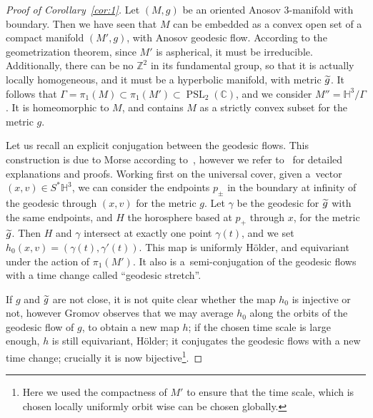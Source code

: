 \documentclass[AHL,Unicode,longabstracts,published]{cedram}
\newcommand{\Z}{\mathbb{Z}}
\newcommand{\C}{\mathbb{C}}
\newcommand{\Hh}{\mathbb{H}}
\DeclareMathOperator{\PSL}{PSL}
\theoremstyle{plain}
\let\oldtilde\tilde
\renewcommand*{\tilde}[1]{\mathchoice{\widetilde{#1}}{\widetilde{#1}}{\oldtilde{#1}}{\oldtilde{#1}}}
\begin{document}
\begin{proof}[Proof of Corollary~\ref{cor:1}]
Let $(M,g)$ be an oriented Anosov 3-manifold with boundary. Then we have seen that $M$ can be embedded as a convex open set of a compact manifold $(M',g)$, with Anosov geodesic flow. According to the geometrization theorem, since $M'$ is aspherical, it must be irreducible. Additionally, there can be no $\Z^2$ in its fundamental group, so that it is actually locally homogeneous, and it must be a hyperbolic manifold, with metric $\tilde{g}$. It follows that $\Gamma=\pi_1(M)\subset \pi_1(M')\subset \PSL_2(\C)$, and we consider $M''= \Hh^3/\Gamma$. It is homeomorphic to $M$, and contains $M$ as a strictly convex subset for the metric $g$.

Let us recall an explicit conjugation between the geodesic flows. This construction is due to Morse according to~\cite{Gromov-00}, however we refer to~\cite[Appendix~B]{Guillarmou-Knieper-Lefeuvre} for detailed explanations and proofs. Working first on the universal cover, given a~vector $(x,v)\in S^\ast \Hh^3$, we can consider the endpoints $p_{\pm}$ in the boundary at infinity of the geodesic through $(x,v)$ for the metric $g$. Let ${\gamma}$ be the geodesic for $\tilde{g}$ with the same endpoints, and $H$ the horosphere based at $p_+$ through $x$, for the metric $\tilde{g}$. Then $H$ and $\gamma$ intersect at exactly one point $\gamma(t)$, and we set $h_0(x,v) = (\gamma(t),\gamma'(t))$. This map is uniformly H\"older, and equivariant under the action of $\pi_1(M')$. It also is a~semi-conjugation of the geodesic flows with a time change called ``geodesic stretch''.

If $g$ and $\tilde{g}$ are not close, it is not quite clear whether the map $h_0$ is injective or not, however Gromov observes that we may average $h_0$ along the orbits of the geodesic flow of $g$, to obtain a new map $h$; if the chosen time scale is large enough, $h$ is still equivariant, H\"older; it conjugates the geodesic flows with a new time change; crucially it is now bijective\footnote{Here we used the compactness of $M'$ to ensure that the time scale, which is chosen locally uniformly orbit wise can be chosen globally.}.



\end{proof}
\end{document}
